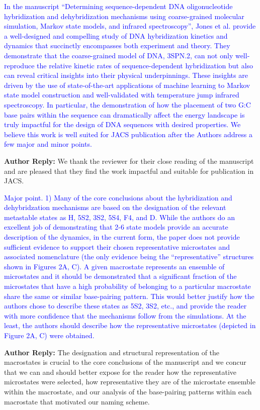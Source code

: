 \documentclass[11pt,a4paper]{letter} %
\begin{document}
\textcolor{blue}{In the manuscript ``Determining sequence-dependent DNA oligonucleotide hybridization and dehybridization mechanisms using coarse-grained molecular simulation, Markov state models, and infrared spectroscopy'', Jones et al. provide a well-designed and compelling study of DNA hybridization kinetics and dynamics that succinctly encompasses both experiment and theory. They demonstrate that the coarse-grained model of DNA, 3SPN.2, can not only well-reproduce the relative kinetic rates of sequence-dependent hybridization but also can reveal critical insights into their physical underpinnings. These insights are driven by the use of state-of-the-art applications of machine learning to Markov state model construction and well-validated with temperature jump infrared spectroscopy. In particular, the demonstration of how the placement of two G:C base pairs within the sequence can dramatically affect the energy landscape is truly impactful for the design of DNA sequences with desired properties. We believe this work is well suited for JACS publication after the Authors address a few major and minor points.}

\textbf{Author Reply:}   We thank the reviewer for their close reading of the manuscript and are pleased that they find the work impactful and suitable for publication in JACS.

\textcolor{blue}{Major point.
1)      Many of the core conclusions about the hybridization and dehybridzation mechanisms are based on the designation of the relevant metastable states as H, 5S2, 3S2, 5S4, F4, and D. While the authors do an excellent job of demonstrating that 2-6 state models provide an accurate description of the dynamics, in the current form, the paper does not provide sufficient evidence to support their chosen representative microstates and associated nomenclature (the only evidence being the ``representative'' structures shown in Figures 2A, C). A given macrostate represents an ensemble of microstates and it should be demonstrated that a significant fraction of the microstates that have a high probability of belonging to a particular macrostate share the same or similar base-pairing pattern. This would better justify how the authors chose to describe these states as 5S2, 3S2, etc., and provide the reader with more confidence that the mechanisms follow from the simulations. At the least, the authors should describe how the representative microstates (depicted in Figure 2A, C) were obtained.
}

\textbf{Author Reply:} The designation and structural representation of the macrostates is crucial to the core conclusions of the manuscript and we concur that we can and should better expose for the reader how the representative microstates were selected, how representative they are of the microstate ensemble within the macrostate, and our analysis of the base-pairing patterns within each macrostate that motivated our naming scheme.
\end{document}
